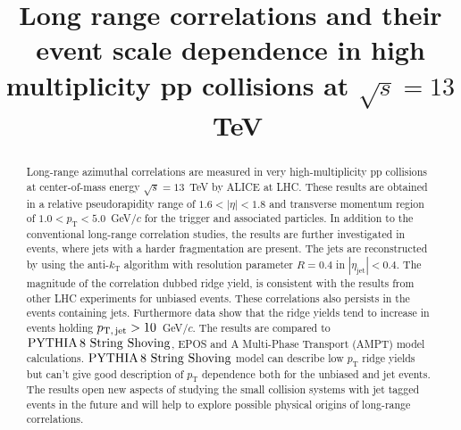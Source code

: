 \documentclass[ALICE,manyauthors]{cernphprep}
\begin{document}
\begin{titlepage}

\PHyear{}
\PHdate{\today}
%

\title{Long range correlations and their event scale dependence in high multiplicity pp collisions at $\sqrt{s} = 13$~TeV}


\begin{abstract}
%

Long-range azimuthal correlations are measured in very high-multiplicity pp collisions at center-of-mass energy $\sqrt{s} = 13$~TeV by ALICE at LHC. 
These results are obtained in a relative pseudorapidity range of $1.6 < |\eta| < 1.8$ and transverse momentum region of $1.0 < p_{\mathrm T} < 5.0$~GeV/$c$ for the trigger and associated particles.
In addition to the conventional long-range correlation studies, the results are further investigated in events, where jets with a harder fragmentation are present.
The jets are reconstructed by using the anti-$k_\mathrm{T}$ algorithm with resolution parameter $R=0.4$ in $|\eta_\mathrm{jet}|<0.4$. 
The magnitude of the correlation dubbed ridge yield, is consistent with the results from other LHC experiments for unbiased events. 
These correlations also persists in the events containing jets. Furthermore data show that the ridge yields tend to increase in events holding $p_\mathrm{T,\,jet} > 10$~GeV/$c$.
The results are compared to $\mathrm{PYTHIA}\,8~\mathrm{String}~\mathrm{Shoving}$, EPOS and A Multi-Phase Transport ({AMPT}) model calculations.  
$\mathrm{PYTHIA}\,8~\mathrm{String}~\mathrm{Shoving}$ model can describe low $p_{\mathrm T}$  ridge yields but can't give good description of  $p_{\mathrm T}$ dependence both for the unbiased and jet events.
The results open new aspects of studying the small collision systems with jet tagged events in the future and will help to explore possible physical origins of long-range correlations.

\end{abstract}

\end{titlepage}
\end{document}

